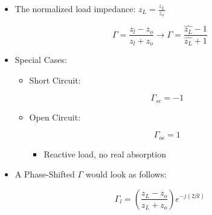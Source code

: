 \begin{itemize}
\begin{itemize}
    \item The normalized load impedance: $\hat{z_L}=\frac{z_L}{z_o}$

      $$\Gamma=\frac{z_l-z_o}{z_l+z_o}\rightarrow\Gamma = \frac{\hat{z_L}-1}{\hat{z_L}+1}$$

    \item Special Cases:

      \begin{itemize}

        \item Short Circuit:

          $$\Gamma_{sc}=-1$$

        \item Open Circuit:

          $$\Gamma_{oc}=1$$

          \begin{itemize}

            \item Reactive load, no real absorption

          \end{itemize}

      \end{itemize}

    \item A Phase-Shifted $\Gamma$ would look as follows:

      $$\Gamma_l=\left(\frac{z_L-z_o}{z_L+z_o}\right)e^{-j(2\beta l)}$$

    \end{itemize}

\end{itemize}



